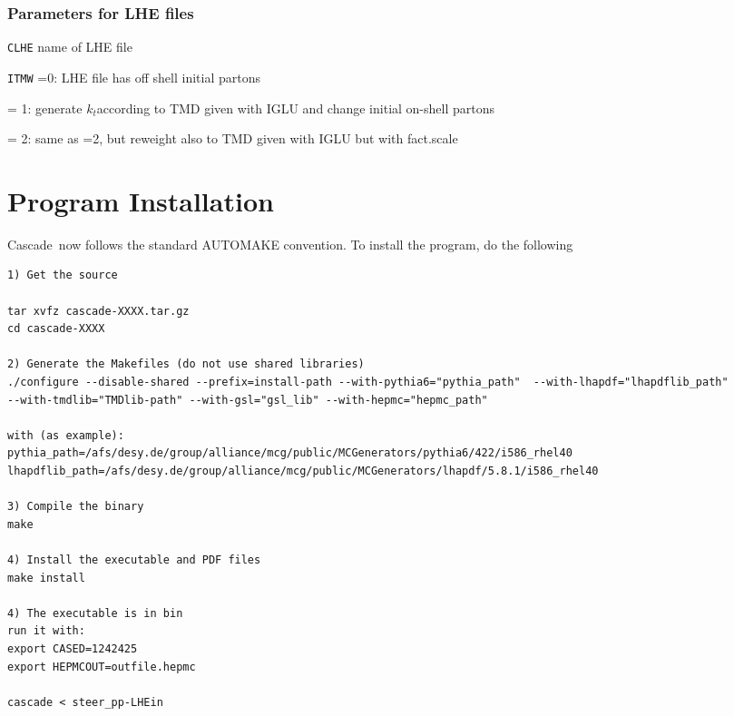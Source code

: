 \documentclass[11pt]{article} \usepackage{mystyle-new}
\newcommand{\deflab}[1]{#1\hfil}%
\newenvironment{defl}[1]%
  {\begin{list}{}{\settowidth{\labelwidth}{#1}%
  \setlength{\leftmargin}{\labelwidth}%
  \addtolength{\leftmargin}{\labelsep}%
  \setlength{\itemsep}{0pt plus 1pt}
  \setlength{\parsep}{0pt plus 1pt}
  \setlength{\topsep}{0pt plus 1pt}
  \setlength{\partopsep}{0pt plus 1pt}
  \setlength{\parskip}{2mm plus 1mm minus 1mm}
  \let\makelabel\deflab}}%
  {\end{list}}
\def\prp{t}
\newcommand{\kt}{k_{t}}
\def\kt{\ensuremath{k_{\prp}}}
\def\cascade{{\sc Cascade}}
\def\SMALLX{{\sc Smallx}}
\begin{document}
\subsubsection{Parameters for LHE files}
\label{sec:lhe}
\begin{defl}{123456789012345}
\item[{\tt CLHE}]  name of LHE file
\item[{\tt ITMW}]  =0:  LHE file has off shell initial partons
\item[] = 1: generate \kt according to TMD given with IGLU and change initial on-shell partons
\item[] = 2: same as =2, but reweight also to TMD given with IGLU but with fact.scale
\end{defl}


%   
\section{Program Installation}
\cascade\ now follows the standard AUTOMAKE
convention. To install the program, do the following
\begin{tiny}
\begin{verbatim}
1) Get the source

tar xvfz cascade-XXXX.tar.gz
cd cascade-XXXX

2) Generate the Makefiles (do not use shared libraries)
./configure --disable-shared --prefix=install-path --with-pythia6="pythia_path"  --with-lhapdf="lhapdflib_path" 
--with-tmdlib="TMDlib-path" --with-gsl="gsl_lib" --with-hepmc="hepmc_path"

with (as example):
pythia_path=/afs/desy.de/group/alliance/mcg/public/MCGenerators/pythia6/422/i586_rhel40
lhapdflib_path=/afs/desy.de/group/alliance/mcg/public/MCGenerators/lhapdf/5.8.1/i586_rhel40

3) Compile the binary
make

4) Install the executable and PDF files
make install 

4) The executable is in bin
run it with:
export CASED=1242425
export HEPMCOUT=outfile.hepmc

cascade < steer_pp-LHEin

\end{verbatim}
\end{tiny}
 

 
\raggedright 
%

\end{document}
